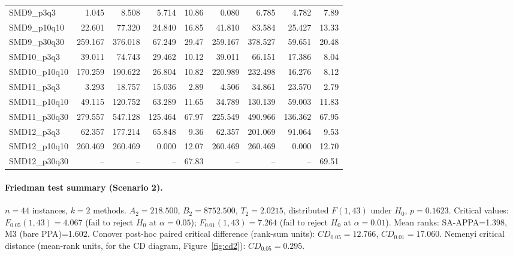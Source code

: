 \begin{longtable}{lrrrrrrrr}
SMD9\_p3q3 & 1.045 & 8.508 & 5.714 & 10.86 & 0.080 & 6.785 & 4.782 & 7.89 \\
SMD9\_p10q10 & 22.601 & 77.320 & 24.840 & 16.85 & 41.810 & 83.584 & 25.427 & 13.33 \\
SMD9\_p30q30 & 259.167 & 376.018 & 67.249 & 29.47 & 259.167 & 378.527 & 59.651 & 20.48 \\
SMD10\_p3q3 & 39.011 & 74.743 & 29.462 & 10.12 & 39.011 & 66.151 & 17.386 & 8.04 \\
SMD10\_p10q10 & 170.259 & 190.622 & 26.804 & 10.82 & 220.989 & 232.498 & 16.276 & 8.12 \\
SMD11\_p3q3 & 3.293 & 18.757 & 15.036 & 2.89 & 4.506 & 34.861 & 23.570 & 2.79 \\
SMD11\_p10q10 & 49.115 & 120.752 & 63.289 & 11.65 & 34.789 & 130.139 & 59.003 & 11.83 \\
SMD11\_p30q30 & 279.557 & 547.128 & 125.464 & 67.97 & 225.549 & 490.966 & 136.362 & 67.95 \\
SMD12\_p3q3 & 62.357 & 177.214 & 65.848 & 9.36 & 62.357 & 201.069 & 91.064 & 9.53 \\
SMD12\_p10q10 & 260.469 & 260.469 & 0.000 & 12.07 & 260.469 & 260.469 & 0.000 & 12.70 \\
SMD12\_p30q30 & -- & -- & -- & 67.83 & -- & -- & -- & 69.51 \\
\end{longtable}
\endgroup

\paragraph{Friedman test summary (Scenario 2).}
$n=44$ instances, $k=2$ methods. $A_2=218.500$, $B_2=8752.500$, $T_2=2.0215$, distributed $F(1,43)$ under $H_0$, $p=0.1623$. Critical values: $F_{0.05}(1,43)=4.067$ (fail to reject $H_0$ at $\alpha=0.05$); $F_{0.01}(1,43)=7.264$ (fail to reject $H_0$ at $\alpha=0.01$). Mean ranks: SA-APPA=1.398, M3 (bare PPA)=1.602. Conover post-hoc paired critical difference (rank-sum units): $CD_{0.05}=12.766$, $CD_{0.01}=17.060$. Nemenyi critical distance (mean-rank units, for the CD diagram, Figure~\ref{fig:cd2}): $CD_{0.05}=0.295$.
